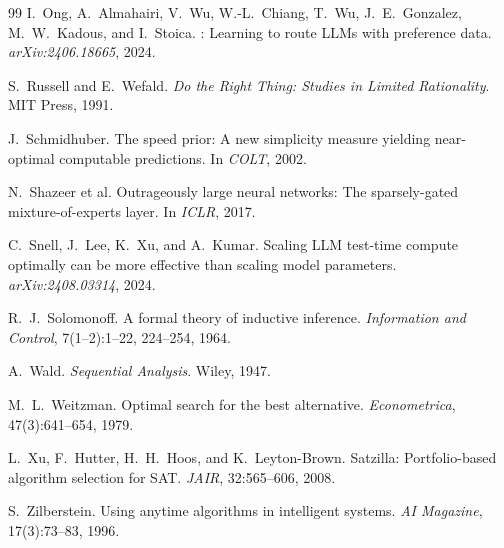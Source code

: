 \documentclass[10pt,twocolumn]{article}
\theoremstyle{paperplain}
\theoremstyle{paperdefinition}
\theoremstyle{paperremark}
\begin{document}
\begin{thebibliography}{99}
I.~Ong, A.~Almahairi, V.~Wu, W.-L.~Chiang, T.~Wu, J.~E.~Gonzalez,
M.~W.~Kadous, and I.~Stoica.
: Learning to route {LLM}s with preference data.
\newblock \emph{arXiv:2406.18665}, 2024.

S.~Russell and E.~Wefald.
\newblock \emph{Do the Right Thing: Studies in Limited Rationality}.
\newblock MIT Press, 1991.

J.~Schmidhuber.
\newblock The speed prior: A new simplicity measure yielding near-optimal computable predictions.
\newblock In \emph{COLT}, 2002.

N.~Shazeer et al.
\newblock Outrageously large neural networks: The sparsely-gated mixture-of-experts layer.
\newblock In \emph{ICLR}, 2017.

C.~Snell, J.~Lee, K.~Xu, and A.~Kumar.
\newblock Scaling {LLM} test-time compute optimally can be more effective than scaling model parameters.
\newblock \emph{arXiv:2408.03314}, 2024.

R.~J.~Solomonoff.
\newblock A formal theory of inductive inference.
\newblock \emph{Information and Control}, 7(1--2):1--22, 224--254, 1964.

A.~Wald.
\newblock \emph{Sequential Analysis}.
\newblock Wiley, 1947.

M.~L.~Weitzman.
\newblock Optimal search for the best alternative.
\newblock \emph{Econometrica}, 47(3):641--654, 1979.

L.~Xu, F.~Hutter, H.~H.~Hoos, and K.~Leyton-Brown.
\newblock Satzilla: Portfolio-based algorithm selection for SAT.
\newblock \emph{JAIR}, 32:565--606, 2008.

S.~Zilberstein.
\newblock Using anytime algorithms in intelligent systems.
\newblock \emph{AI Magazine}, 17(3):73--83, 1996.

\end{thebibliography}
\end{document}

